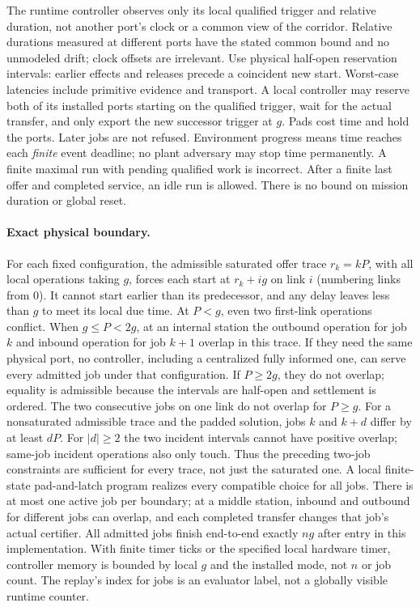 \documentclass[11pt]{article}
\begin{document}
The runtime controller observes only its local qualified trigger
and relative duration, not another port's clock or a common
view of the corridor. Relative durations measured at different
ports have the stated common bound and no unmodeled drift;
clock offsets are irrelevant. Use physical half-open reservation
intervals: earlier effects and releases precede a coincident new
start. Worst-case latencies include primitive evidence and
transport. A local controller may reserve both of its installed
ports starting on the qualified trigger, wait for the actual
transfer, and only export the new successor trigger at \(g\).
Pads cost time and hold the ports. Later jobs are not refused.
Environment progress means time reaches each \emph{finite}
event deadline; no plant adversary may stop time permanently.
A finite maximal run with pending qualified work is incorrect.
After a finite last offer and completed service, an idle run is
allowed. There is no bound on mission duration or global reset.

\paragraph{Exact physical boundary.}
For each fixed configuration, the admissible saturated offer
trace \(r_k=kP\), with all local operations taking \(g\),
forces each start at \(r_k+i g\) on link \(i\) (numbering
links from 0). It cannot start earlier than its predecessor,
and any delay leaves less than \(g\) to meet its local due
time. At \(P<g\), even two first-link operations conflict.
When \(g\le P<2g\), at an internal station the outbound
operation for job \(k\) and inbound operation for job \(k+1\)
overlap in this trace. If they need the same physical port,
no controller, including a centralized fully informed one,
can serve every admitted job under that configuration. If
\(P\ge2g\), they do not overlap; equality is admissible
because the intervals are half-open and settlement is ordered.
The two consecutive jobs on one link do not overlap for
\(P\ge g\). For a nonsaturated admissible trace and the padded
solution, jobs \(k\) and \(k+d\) differ by at least \(dP\).
For \(|d|\ge2\) the two incident intervals cannot have
positive overlap; same-job incident operations also only touch.
Thus the preceding two-job constraints are sufficient for
every trace, not just the saturated one. A local finite-state
pad-and-latch program realizes every compatible choice for
all jobs. There is at most one active job per boundary; at a
middle station, inbound and outbound for different jobs can
overlap, and each completed transfer changes that job's
actual certifier. All admitted jobs finish end-to-end exactly
\(ng\) after entry in this implementation. With finite timer
ticks or the specified local hardware timer, controller memory
is bounded by local \(g\) and the installed mode, not \(n\)
or job count. The replay's index for jobs is an evaluator label,
not a globally visible runtime counter.
\end{document}
